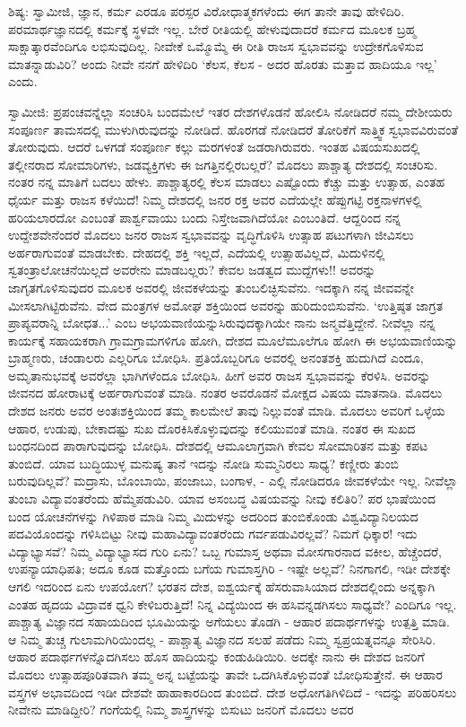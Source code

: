 ಶಿಷ್ಯ: ಸ್ವಾಮೀಜಿ, ಜ್ಞಾನ, ಕರ್ಮ ಎರಡೂ ಪರಸ್ಪರ ವಿರೋಧಾತ್ಮಕಗಳೆಂದು ಈಗ ತಾನೇ ತಾವು ಹೇಳಿದಿರಿ. ಪರಮಾರ್ಥಜ್ಞಾನದಲ್ಲಿ ಕರ್ಮಕ್ಕೆ ಸ್ಥಳವೇ ಇಲ್ಲ. ಬೇರೆ ರೀತಿಯಲ್ಲಿ ಹೇಳುವುದಾದರೆ ಕರ್ಮದ ಮೂಲಕ ಬ್ರಹ್ಮ ಸಾಕ್ಷಾತ್ಕಾರವೆಂದಿಗೂ ಲಭಿಸುವುದಿಲ್ಲ. ನೀವೇಕೆ ಒಮ್ಮೊಮ್ಮೆ ಈ ರೀತಿ ರಾಜಸ ಸ್ವಭಾವವನ್ನು ಉದ್ರೇಕಗೊಳಿಸುವ ಮಾತನ್ನಾಡುವಿರಿ? ಅಂದು ನೀವೇ ನನಗೆ ಹೇಳಿದಿರಿ ‘ಕೆಲಸ, ಕೆಲಸ - ಅದರ ಹೊರತು ಮತ್ತಾವ ಹಾದಿಯೂ ಇಲ್ಲ’ ಎಂದು.

ಸ್ವಾಮೀಜಿ: ಪ್ರಪಂಚವನ್ನೆಲ್ಲಾ ಸಂಚರಿಸಿ ಬಂದಮೇಲೆ ಇತರ ದೇಶಗಳೊಡನೆ ಹೋಲಿಸಿ ನೋಡಿದರೆ ನಮ್ಮ ದೇಶೀಯರು ಸಂಪೂರ್ಣ ತಾಮಸದಲ್ಲಿ ಮುಳುಗಿರುವುದನ್ನು ನೋಡಿದೆ. ಹೊರಗಡೆ ನೋಡಿದರೆ ತೋರಿಕೆಗೆ ಸಾತ್ತ್ವಿಕ ಸ್ವಭಾವವಿರುವಂತೆ ತೋರುವುದು. ಆದರೆ ಒಳಗಡೆ ಸಂಪೂರ್ಣ ಕಲ್ಲು ಮರಗಳಂತೆ ಜಡರಾಗಿರುವರು. ಇಂತಹ ವಿಷಯಸುಖದಲ್ಲಿ ತಲ್ಲೀನರಾದ ಸೋಮಾರಿಗಳು, ಜಡವ್ಯಕ್ತಿಗಳು ಈ ಜಗತ್ತಿನಲ್ಲಿರಬಲ್ಲರೆ? ಮೊದಲು ಪಾಶ್ಚಾತ್ಯ ದೇಶದಲ್ಲಿ ಸಂಚರಿಸು. ನಂತರ ನನ್ನ ಮಾತಿಗೆ ಬದಲು ಹೇಳು. ಪಾಶ್ಚಾತ್ಯರಲ್ಲಿ ಕೆಲಸ ಮಾಡಲು ಎಷ್ಟೊಂದು ಕೆಚ್ಚು ಮತ್ತು ಉತ್ಸಾಹ, ಎಂತಹ ಧೈರ್ಯ ಮತ್ತು ರಾಜಸ ಕಳೆಯಿದೆ! ನಿಮ್ಮ ದೇಶದಲ್ಲಿ ಜನರ ರಕ್ತ ಅವರ ಎದೆಯಲ್ಲೇ ಹೆಪ್ಪುಗಟ್ಟಿ ರಕ್ತನಾಳಗಳಲ್ಲಿ ಹರಿಯಲಾರದೋ ಎಂಬಂತೆ ಪಾರ್ಶ್ವವಾಯು ಬಂದು ನಿಸ್ತೇಜವಾಗಿದೆಯೋ ಎಂಬಂತಿದೆ. ಆದ್ದರಿಂದ ನನ್ನ ಉದ್ದೇಶವೇನೆಂದರೆ ಮೊದಲು ಜನರ ರಾಜಸ ಸ್ವಭಾವವನ್ನು ವೃದ್ಧಿಗೊಳಿಸಿ ಉತ್ಸಾಹ ಪಟುಗಳಾಗಿ ಜೀವಿಸಲು ಅರ್ಹರಾಗುವಂತೆ ಮಾಡಬೇಕು. ದೇಹದಲ್ಲಿ ಶಕ್ತಿ ಇಲ್ಲದೆ, ಎದೆಯಲ್ಲಿ ಉತ್ಸಾಹವಿಲ್ಲದೆ, ಮಿದುಳಿನಲ್ಲಿ ಸ್ವತಂತ್ರಾಲೋಚನೆಯಿಲ್ಲದೆ ಅವರೇನು ಮಾಡಬಲ್ಲರು? ಕೇವಲ ಜಡತ್ವದ ಮುದ್ದೆಗಳು!! ಅವರನ್ನು ಜಾಗೃತಗೊಳಿಸುವುದರ ಮೂಲಕ ಅವರಲ್ಲಿ ಜೀವಕಳೆಯನ್ನು ತುಂಬಲಿಚ್ಛಿಸುವೆನು. ಇದಕ್ಕಾಗಿ ನನ್ನ ಜೀವವನ್ನೇ ಮೀಸಲಾಗಿಟ್ಟಿರುವೆನು. ವೇದ ಮಂತ್ರಗಳ ಅಮೋಘ ಶಕ್ತಿಯಿಂದ ಅವರನ್ನು ಹುರಿದುಂಬಿಸುವೆನು. ‘ಉತ್ತಿಷ್ಠತ ಜಾಗ್ರತ ಪ್ರಾಪ್ಯವರಾನ್ನಿ ಬೋಧತ...’ ಎಂಬ ಅಭಯವಾಣಿಯನ್ನುಸಿರುವುದಕ್ಕಾಗಿಯೇ ನಾನು ಜನ್ಮವೆತ್ತಿದ್ದೇನೆ. ನೀವೆಲ್ಲಾ ನನ್ನ ಕಾರ್ಯಕ್ಕೆ ಸಹಾಯಕರಾಗಿ ಗ್ರಾಮಗ್ರಾಮಗಳಿಗೂ ಹೋಗಿ, ದೇಶದ ಮೂಲೆಮೂಲೆಗೂ ಹೋಗಿ ಈ ಅಭಯವಾಣಿಯನ್ನು ಬ್ರಾಹ್ಮಣರು, ಚಂಡಾಲರು ಎಲ್ಲರಿಗೂ ಬೋಧಿಸಿ. ಪ್ರತಿಯೊಬ್ಬರಿಗೂ ಅವರಲ್ಲಿ ಅನಂತಶಕ್ತಿ ಹುದುಗಿದೆ ಎಂದೂ, ಅಮೃತಾನುಭವಕ್ಕೆ ಅವರೆಲ್ಲಾ ಭಾಗಿಗಳೆಂದೂ ಬೋಧಿಸಿ. ಹೀಗೆ ಅವರ ರಾಜಸ ಸ್ವಭಾವವನ್ನು ಕೆರಳಿಸಿ. ಅವರನ್ನು ಜೀವನದ ಹೋರಾಟಕ್ಕೆ ಅರ್ಹರಾಗುವಂತೆ ಮಾಡಿ. ನಂತರ ಅವರೊಡನೆ ಮೋಕ್ಷದ ವಿಷಯ ಮಾತನಾಡಿ. ಮೊದಲು ದೇಶದ ಜನರು ಅವರ ಅಂತಃಶಕ್ತಿಯಿಂದ ತಮ್ಮ ಕಾಲಮೇಲೆ ತಾವು ನಿಲ್ಲುವಂತೆ ಮಾಡಿ. ಮೊದಲು ಅವರಿಗೆ ಒಳ್ಳೆಯ ಆಹಾರ, ಉಡುಪು, ಬೇಕಾದಷ್ಟು ಸುಖ ದೊರಕಿಸಿಕೊಳ್ಳುವುದನ್ನು ಕಲಿಯುವಂತೆ ಮಾಡಿ. ನಂತರ ಈ ಸುಖದ ಬಂಧನದಿಂದ ಪಾರಾಗುವುದನ್ನು ಬೋಧಿಸಿ. ದೇಶದಲ್ಲಿ ಆಮೂಲಾಗ್ರವಾಗಿ ಕೇವಲ ಸೋಮಾರಿತನ ಮತ್ತು ಕಪಟ ತುಂಬಿದೆ. ಯಾವ ಬುದ್ಧಿಯುಳ್ಳ ಮನುಷ್ಯ ತಾನೆ ಇದನ್ನು ನೋಡಿ ಸುಮ್ಮನಿರಲು ಸಾಧ್ಯ? ಕಣ್ಣೀರು ತುಂಬಿ ಬರುವುದಿಲ್ಲವೆ? ಮದ್ರಾಸು, ಬೊಂಬಾಯಿ, ಪಂಜಾಬು, ಬಂಗಾಳ, - ಎಲ್ಲಿ ನೋಡಿದರೂ ಜೀವಕಳೆಯೇ ಇಲ್ಲ. ನೀವೆಲ್ಲಾ ತುಂಬಾ ವಿದ್ಯಾವಂತರೆಂದು ಹೆಮ್ಮೆಪಡುವಿರಿ. ಯಾವ ಅಸಂಬದ್ಧ ವಿಷಯವನ್ನು ನೀವು ಕಲಿತಿರಿ? ಪರ ಭಾಷೆಯಿಂದ ಬಂದ ಯೋಚನೆಗಳನ್ನು ಗಿಳಿಪಾಠ ಮಾಡಿ ನಿಮ್ಮ ಮಿದುಳನ್ನು ಅದರಿಂದ ತುಂಬಿಕೊಂಡು ವಿಶ್ವವಿದ್ಯಾನಿಲಯದ ಪದವಿಯೊಂದನ್ನು ಗಳಿಸಿಬಿಟ್ಟು ನೀವು ಮಹಾವಿದ್ಯಾವಂತರೆಂದು ಗರ್ವಪಡುವಿರಲ್ಲವೆ? ನಿಮಗೆ ಧಿಕ್ಕಾರ! ಇದು ವಿದ್ಯಾಭ್ಯಾಸವೆ? ನಿಮ್ಮ ವಿದ್ಯಾಭ್ಯಾಸದ ಗುರಿ ಏನು? ಒಬ್ಬ ಗುಮಾಸ್ತ ಅಥವಾ ಮೋಸಗಾರನಾದ ವಕೀಲ, ಹೆಚ್ಚೆಂದರೆ, ಉಪನ್ಯಾಯಾಧಿಪತಿ; ಅದೂ ಕೂಡ ಮತ್ತೊಂದು ಬಗೆಯ ಗುಮಾಸ್ತಗಿರಿ - ಇಷ್ಟೇ ಅಲ್ಲವೆ? ನಿನಗಾಗಲಿ, ಇಡೀ ದೇಶಕ್ಕೇ ಆಗಲಿ ಇದರಿಂದ ಏನು ಉಪಯೋಗ? ಭರತನ ದೇಶ, ಐಶ್ವರ್ಯಕ್ಕೆ ಹೆಸರುವಾಸಿಯಾದ ದೇಶದಲ್ಲಿಂದು ಅನ್ನಕ್ಕಾಗಿ ಎಂತಹ ಹೃದಯ ವಿದ್ರಾವಕ ಧ್ವನಿ ಕೇಳಿಬರುತ್ತಿದೆ! ನಿನ್ನ ವಿದ್ಯೆಯಿಂದ ಈ ಹಸಿವನ್ನಡಗಿಸಲು ಸಾಧ್ಯವೇ? ಎಂದಿಗೂ ಇಲ್ಲ. ಪಾಶ್ಚಾತ್ಯ ವಿಜ್ಞಾನದ ಸಹಾಯದಿಂದ ಭೂಮಿಯನ್ನು ಅಗೆಯಲು ತೊಡಗಿ - ಆಹಾರ ಪದಾರ್ಥಗಳನ್ನು ಉತ್ಪತ್ತಿ ಮಾಡಿ. ಆ ನಿಮ್ಮ ತುಚ್ಚ ಗುಲಾಮಗಿರಿಯಿಂದಲ್ಲ - ಪಾಶ್ಚಾತ್ಯ ವಿಜ್ಞಾನದ ಸಲಹೆ ಪಡೆದು ನಿಮ್ಮ ಸ್ವಪ್ರಯತ್ನವನ್ನೂ ಸೇರಿಸಿರಿ. ಆಹಾರ ಪದಾರ್ಥಗಳನ್ನೊದಗಿಸಲು ಹೊಸ ಹಾದಿಯನ್ನು ಕಂಡುಹಿಡಿಯಿರಿ. ಅದಕ್ಕೇ ನಾನು ಈ ದೇಶದ ಜನರಿಗೆ ಮೊದಲು ಉತ್ಸಾಹಪೂರಿತವಾಗಿ ತಮ್ಮ ಅನ್ನ ಬಟ್ಟೆಯನ್ನು ತಾವೇ ಒದಗಿಸಿಕೊಳ್ಳುವಂತೆ ಬೋಧಿಸುತ್ತೇನೆ. ಈ ಆಹಾರ ವಸ್ತ್ರಗಳ ಅಭಾವದಿಂದ ಇಡೀ ದೇಶವೇ ಹಾಹಾಕಾರದಿಂದ ತುಂಬಿದೆ. ದೇಶ ಅಧೋಗತಿಗಿಳಿದಿದೆ - ಇದನ್ನು ಪರಿಹರಿಸಲು ನೀವೇನು ಮಾಡಿದ್ದೀರಿ? ಗಂಗೆಯಲ್ಲಿ ನಿಮ್ಮ ಶಾಸ್ತ್ರಗಳನ್ನು ಬಿಸುಟು ಜನರಿಗೆ ಮೊದಲು ಅವರ 